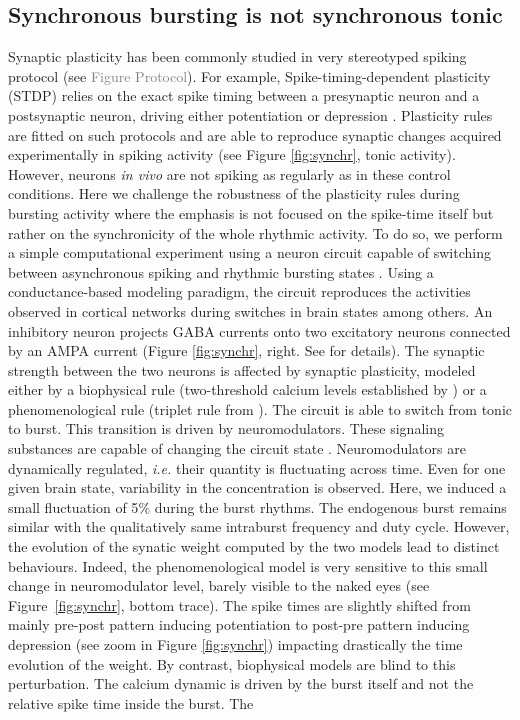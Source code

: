 \subsection{Synchronous bursting is not synchronous tonic}
Synaptic plasticity has been commonly studied in very stereotyped spiking protocol (see \textcolor{gray}{Figure Protocol}). For example, Spike-timing-dependent plasticity (STDP) relies on the exact spike timing between a presynaptic neuron and a postsynaptic neuron, driving either potentiation or depression \citep{bi_synaptic_1998}. Plasticity rules are fitted on such protocols and are able to reproduce synaptic changes acquired experimentally in spiking activity (see Figure \ref{fig:synchr}, tonic activity). However, neurons \textit{in vivo}  are not spiking as regularly as in these control conditions. Here we challenge the robustness of the plasticity rules during bursting activity where the emphasis is not focused on the spike-time itself but rather on the synchronicity of the whole rhythmic activity. To do so, we perform a simple computational experiment using a neuron circuit capable of switching between asynchronous spiking and rhythmic bursting states \citep{jacquerie_robust_2021, jacquerie_switches_2022}. Using a conductance-based modeling paradigm, the circuit reproduces the activities observed in cortical networks during switches in brain states \citep{mccormick_sleep_1997, zagha_neural_2014,chrol-cannon_computational_2014} among others. An inhibitory neuron projects GABA currents onto two excitatory neurons connected by an AMPA current (Figure \ref{fig:synchr}, right. See  for details). The synaptic strength between the two neurons is affected by synaptic plasticity, modeled either by a biophysical rule (two-threshold calcium levels established by \citep{graupner_natural_2016}) or a phenomenological rule (triplet rule from \citep{pfister_triplets_2006}). The circuit is able to switch from tonic to burst. This transition is driven by neuromodulators. These signaling substances are capable of changing the circuit state \citep{marder_neuromodulation_2014}. Neuromodulators are dynamically regulated, \textit{i.e.} their quantity is fluctuating across time. Even for one given brain state, variability in the concentration is observed. Here, we induced a small fluctuation of 5$\%$ during the burst rhythms. The endogenous burst remains similar with the qualitatively same intraburst frequency and duty cycle.  However, the evolution of the synatic weight computed by the two models lead to distinct behaviours. Indeed,  the phenomenological model is very sensitive to this small change in neuromodulator level, barely visible to the naked eyes (see Figure~\ref{fig:synchr}, bottom trace). The spike times are slightly shifted from mainly pre-post pattern inducing potentiation to post-pre pattern inducing depression (see zoom in Figure \ref{fig:synchr}) impacting drastically the time evolution of the weight. By contrast, biophysical models are blind to this perturbation. The calcium dynamic is driven by the burst itself and not the relative spike time inside the burst. The 
